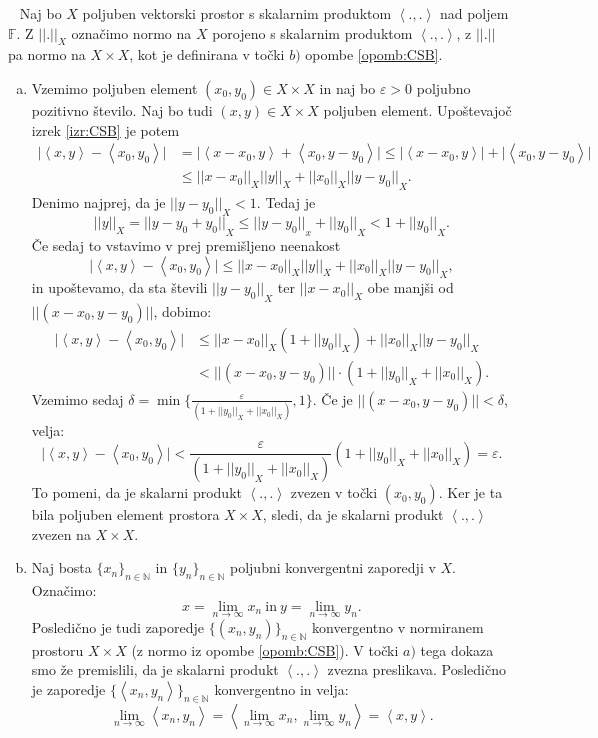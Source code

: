 \documentclass[12pt,a4paper,oneside,fleqn,openany]{book}
\newcommand{\eopf}{\raisebox{0.8ex}{\framebox{}}} %
\newenvironment{dokaz}%
{\noindent{\bf Dokaz.}\ }%
{\hfill\eopf\par\bigskip}%
\newcommand{\F}{\mathbb{F}}
\newcommand{\N}{\mathbb{N}}
\newcommand{\abs}[1]{\ensuremath{\lvert #1 \rvert}}
\newcommand{\norm}[1]{\abs{\abs{#1}}}
\newcommand{\Sp}[2]{\ensuremath{\left<#1, #2\right>}}
\begin{document}
\begin{dokaz}
	Naj bo $X$ poljuben vektorski prostor s skalarnim produktom $\Sp{.}{.}$ nad poljem $\F$. Z $\norm{.}_X$ označimo normo na $X$ porojeno s skalarnim produktom $\Sp{.}{.}$, z $\norm{.}$ pa normo na $X\times X$, kot je definirana v točki $b)$ opombe \ref{opomb:CSB}. \begin{enumerate}[a)]
		\item Vzemimo poljuben element $(x_0, y_0)\in X\times X$ in naj bo $\varepsilon>0$ poljubno pozitivno število. Naj bo tudi $(x, y)\in X\times X$ poljuben element. Upoštevajoč izrek \ref{izr:CSB} je potem \begin{align*}
			\abs{\Sp{x}{y} - \Sp{x_0}{y_0}}&=\abs{\Sp{x-x_0}{y}+\Sp{x_0}{y-y_0}}
			\leq \abs{\Sp{x-x_0}{y}}+\abs{\Sp{x_0}{y-y_0}} \\ &\leq\norm{x-x_0}_X\norm{y}_X + \norm{x_0}_X\norm{y-y_0}_X.
		\end{align*} Denimo najprej, da je $\norm{y-y_0}_X<1$. Tedaj je $$\norm{y}_X = \norm{y-y_0+y_0}_X\leq \norm{y-y_0}_x + \norm{y_0}_X < 1 + \norm{y_0}_X.$$ Če sedaj to vstavimo v prej premišljeno neenakost $$\abs{\Sp{x}{y} - \Sp{x_0}{y_0}} \leq \norm{x-x_0}_X\norm{y}_X + \norm{x_0}_X\norm{y-y_0}_X,$$ in upoštevamo, da sta števili $\norm{y-y_0}_X$ ter $\norm{x-x_0}_X$ obe manjši od $\norm{(x-x_0,y-y_0)}$, dobimo: \begin{align*}
		\abs{\Sp{x}{y} - \Sp{x_0}{y_0}}&\leq \norm{x-x_0}_X(1+\norm{y_0}_X) +\norm{x_0}_X\norm{y-y_0}_X \\ &< \norm{(x-x_0, y-y_0)}\cdot(1 + \norm{y_0}_X+\norm{x_0}_X).
		\end{align*} Vzemimo sedaj $\delta = \min\{\frac{\varepsilon}{(1 + \norm{y_0}_X+\norm{x_0}_X)}, 1\}$. Če je $\norm{(x-x_0, y-y_0)}<\delta$, velja: $$\abs{\Sp{x}{y} - \Sp{x_0}{y_0}} < \frac{\varepsilon}{(1 + \norm{y_0}_X+\norm{x_0}_X)}(1 + \norm{y_0}_X+\norm{x_0}_X)=\varepsilon.$$ To pomeni, da je skalarni produkt $\Sp{.}{.}$ zvezen v točki $(x_0, y_0)$. Ker je ta bila poljuben element prostora $X\times X$, sledi, da je skalarni produkt $\Sp{.}{.}$ zvezen na $X\times X$.
		\item Naj bosta $\{x_n\}_{n\in\N}$ in $\{y_n\}_{n\in\N}$ poljubni konvergentni zaporedji v $X$. Označimo: $$x = \lim_{n\to \infty}x_n~\text{in}~y = \lim_{n\to \infty}y_n.$$ Posledično je tudi zaporedje $\{(x_n, y_n)\}_{n\in\N}$ konvergentno v normiranem prostoru $X\times X$ (z normo iz opombe \ref{opomb:CSB}). V točki $a)$ tega dokaza smo že premislili, da je skalarni produkt $\Sp{.}{.}$ zvezna preslikava. Posledično je zaporedje $\{\Sp{x_n}{y_n}\}_{n\in\N}$ konvergentno in velja: $$\lim_{n\to \infty}\Sp{x_n}{y_n} = \Sp{\lim_{n\to \infty}x_n}{\lim_{n\to \infty}y_n} = \Sp{x}{y}.$$
	\end{enumerate} 
\end{dokaz}
\end{document}
